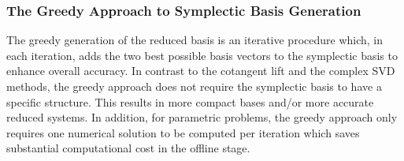 \subsubsection{\bf The Greedy Approach to Symplectic Basis Generation} The greedy generation of the reduced basis is an iterative procedure which, in each iteration, adds the two best possible basis vectors to the symplectic basis to enhance overall accuracy. In contrast to the cotangent lift and the complex SVD methods, the greedy approach does not require the symplectic basis to have a specific structure. This results in more compact bases and/or more accurate reduced systems. In addition, for parametric problems, the greedy approach only requires one numerical solution to be computed per iteration which saves substantial computational cost in the offline stage. 

